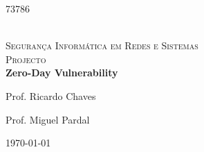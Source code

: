 \begin{titlepage}
\begin{center}
\begin{minipage}{0.25\textwidth}
                        73786
		\end{minipage}\\[2cm]

		\textsc{\LARGE Segurança Informática em Redes e Sistemas}\\[1.5cm]

		\textsc{\Large Projecto}\\[1.5cm]


		{ \huge \bfseries Zero-Day Vulnerability \\[5cm] }


		\noindent

		\begin{minipage}{0.4\textwidth}
			\begin{flushleft} \Large
				Prof. Ricardo Chaves
			\end{flushleft}
		\end{minipage}
		\begin{minipage}{0.4\textwidth}
			\begin{flushright} \Large
				Prof. Miguel Pardal
			\end{flushright}
		\end{minipage}

		\vfill

		{\large \today}

	\end{center}

\end{titlepage}